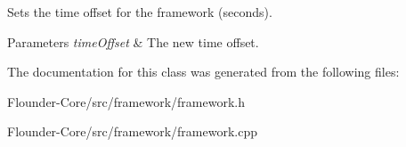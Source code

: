 Sets the time offset for the framework (seconds). 


\begin{DoxyParams}{Parameters}
{\em time\+Offset} & The new time offset. \\
\hline
\end{DoxyParams}


The documentation for this class was generated from the following files\+:\begin{DoxyCompactItemize}
\item 
Flounder-\/\+Core/src/framework/framework.\+h\item 
Flounder-\/\+Core/src/framework/framework.\+cpp\end{DoxyCompactItemize}

